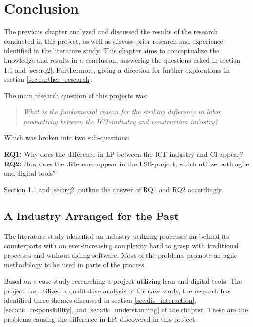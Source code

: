 
\chapter{Conclusion} \label{cha:conclusion}
The previous chapter analyzed and discussed the results of the research conducted in this project, as well as discuss prior research and experience identified in the literature study. This chapter aims to conceptualize the knowledge and results in a conclusion, answering the questions asked in section \ref{sec:rq1} and \ref{sec:rq2}. Furthermore, giving a direction for further explorations in section \ref{sec:further_research}.

\noindent The main research question of this projects was: 
\begin{quote}
    \textit{What is the fundamental reason for the striking difference in labor productivity between the ICT-industry and construction industry?} 
\end{quote}

\noindent Which was broken into two sub-questions:

{\noindent \bf RQ1:} Why does the difference in LP between the ICT-industry and CI appear? \\
{\bf RQ2:} How does the difference appear in the LSB-project, which utilize both agile and digital tools?

Section \ref{sec:rq1} and \ref{sec:rq2} outline the answer of RQ1 and RQ2 accordingly.

\section{A Industry Arranged for the Past} \label{sec:rq1}
The literature study identified an industry utilizing processes far behind its counterparts with an ever-increasing complexity hard to grasp with traditional processes and without aiding software. Most of the problems promote an agile methodology to be used in parts of the process. 

Based on a case study researching a project utilizing lean and digital tools. The project has utilized a qualitative analysis of the case study, the research has identified three themes discussed in section \ref{sec:dis_interaction}, \ref{sec:dis_responsibility}, and \ref{sec:dis_understanding} of the  chapter. These are the problems causing the difference in LP, discovered in this project.

